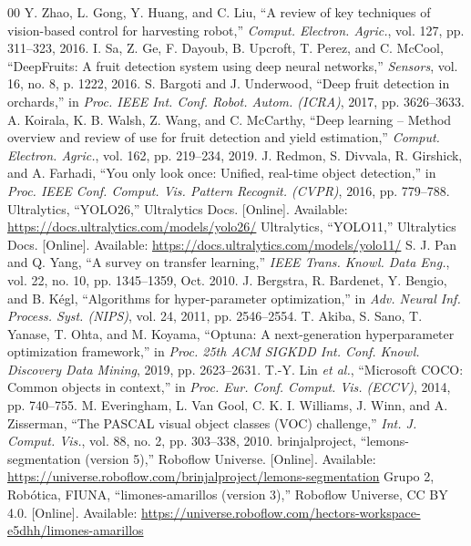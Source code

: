 \documentclass[conference]{IEEEtran}
\begin{document}
\begin{thebibliography}{00}
 Y. Zhao, L. Gong, Y. Huang, and C. Liu, ``A review of key techniques of vision-based control for harvesting robot,'' \textit{Comput. Electron. Agric.}, vol. 127, pp. 311--323, 2016.
 I. Sa, Z. Ge, F. Dayoub, B. Upcroft, T. Perez, and C. McCool, ``DeepFruits: A fruit detection system using deep neural networks,'' \textit{Sensors}, vol. 16, no. 8, p. 1222, 2016.
 S. Bargoti and J. Underwood, ``Deep fruit detection in orchards,'' in \textit{Proc. IEEE Int. Conf. Robot. Autom. (ICRA)}, 2017, pp. 3626--3633.
 A. Koirala, K. B. Walsh, Z. Wang, and C. McCarthy, ``Deep learning -- Method overview and review of use for fruit detection and yield estimation,'' \textit{Comput. Electron. Agric.}, vol. 162, pp. 219--234, 2019.
 J. Redmon, S. Divvala, R. Girshick, and A. Farhadi, ``You only look once: Unified, real-time object detection,'' in \textit{Proc. IEEE Conf. Comput. Vis. Pattern Recognit. (CVPR)}, 2016, pp. 779--788.
 Ultralytics, ``YOLO26,'' Ultralytics Docs. [Online]. Available: \url{https://docs.ultralytics.com/models/yolo26/}
 Ultralytics, ``YOLO11,'' Ultralytics Docs. [Online]. Available: \url{https://docs.ultralytics.com/models/yolo11/}
 S. J. Pan and Q. Yang, ``A survey on transfer learning,'' \textit{IEEE Trans. Knowl. Data Eng.}, vol. 22, no. 10, pp. 1345--1359, Oct. 2010.
 J. Bergstra, R. Bardenet, Y. Bengio, and B. K\'egl, ``Algorithms for hyper-parameter optimization,'' in \textit{Adv. Neural Inf. Process. Syst. (NIPS)}, vol. 24, 2011, pp. 2546--2554.
 T. Akiba, S. Sano, T. Yanase, T. Ohta, and M. Koyama, ``Optuna: A next-generation hyperparameter optimization framework,'' in \textit{Proc. 25th ACM SIGKDD Int. Conf. Knowl. Discovery Data Mining}, 2019, pp. 2623--2631.
 T.-Y. Lin \textit{et al.}, ``Microsoft COCO: Common objects in context,'' in \textit{Proc. Eur. Conf. Comput. Vis. (ECCV)}, 2014, pp. 740--755.
 M. Everingham, L. Van Gool, C. K. I. Williams, J. Winn, and A. Zisserman, ``The PASCAL visual object classes (VOC) challenge,'' \textit{Int. J. Comput. Vis.}, vol. 88, no. 2, pp. 303--338, 2010.
 brinjalproject, ``lemons-segmentation (version 5),'' Roboflow Universe. [Online]. Available: \url{https://universe.roboflow.com/brinjalproject/lemons-segmentation}
 Grupo 2, Robótica, FIUNA, ``limones-amarillos (version 3),'' Roboflow Universe, CC BY 4.0. [Online]. Available: \url{https://universe.roboflow.com/hectors-workspace-e5dhh/limones-amarillos}
\end{thebibliography}
\end{document}
